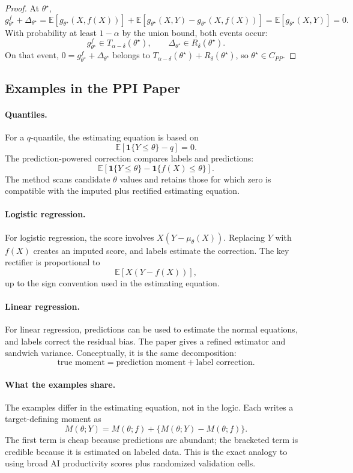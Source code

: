 \documentclass[11pt]{article}
\newcommand{\E}{\mathbb{E}}
\newcommand{\ind}{\mathbf{1}}
\begin{document}
\begin{proof}
At $\theta^\star$,
\[
  g_{\theta^\star}^f+\Delta_{\theta^\star}
  =
  \E[g_{\theta^\star}(X,f(X))]
  +
  \E[g_{\theta^\star}(X,Y)-g_{\theta^\star}(X,f(X))]
  =
  \E[g_{\theta^\star}(X,Y)]
  =
  0.
\]
With probability at least $1-\alpha$ by the union bound, both events occur:
\[
  g_{\theta^\star}^f\in T_{\alpha-\delta}(\theta^\star),
  \qquad
  \Delta_{\theta^\star}\in R_\delta(\theta^\star).
\]
On that event, $0=g_{\theta^\star}^f+\Delta_{\theta^\star}$ belongs to
$T_{\alpha-\delta}(\theta^\star)+R_\delta(\theta^\star)$, so $\theta^\star\in C_{PP}$.
\end{proof}

\subsection{Examples in the PPI Paper}

\paragraph{Quantiles.}
For a $q$-quantile, the estimating equation is based on
\[
  \E[\ind\{Y\le \theta\}-q]=0.
\]
The prediction-powered correction compares labels and predictions:
\[
  \E[\ind\{Y\le\theta\}-\ind\{f(X)\le\theta\}].
\]
The method scans candidate $\theta$ values and retains those for which zero is compatible with the imputed plus rectified estimating equation.

\paragraph{Logistic regression.}
For logistic regression, the score involves $X(Y-\mu_\theta(X))$. Replacing $Y$ with $f(X)$ creates an imputed score, and labels estimate the correction. The key rectifier is proportional to
\[
  \E[X(Y-f(X))],
\]
up to the sign convention used in the estimating equation.

\paragraph{Linear regression.}
For linear regression, predictions can be used to estimate the normal equations, and labels correct the residual bias. The paper gives a refined estimator and sandwich variance. Conceptually, it is the same decomposition:
\[
  \text{true moment}
  =
  \text{prediction moment}
  +
  \text{label correction}.
\]

\paragraph{What the examples share.}
The examples differ in the estimating equation, not in the logic. Each writes a target-defining moment as
\[
  M(\theta;Y)
  =
  M(\theta;f)
  +
  \{M(\theta;Y)-M(\theta;f)\}.
\]
The first term is cheap because predictions are abundant; the bracketed term is credible because it is estimated on labeled data. This is the exact analogy to using broad AI productivity scores plus randomized validation cells.
\end{document}
